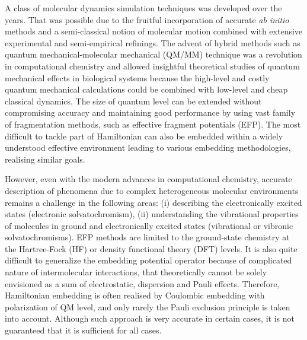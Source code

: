 \documentclass[aip,graphicx]{revtex4-1}
\begin{document}
A class of molecular dynamics simulation techniques was developed over the years. That was possible
due to the fruitful incorporation of accurate \emph{ab initio} methods and a 
semi\hyp{}classical notion of molecular motion combined with extensive experimental and semi\hyp{}empirical
refinings. The advent of hybrid methods such as quantum mechanical\hyp{}molecular mechanical (QM/MM)
technique was a revolution in computational chemistry and allowed insightful theoretical studies
of quantum mechanical effects in biological systems because the high\hyp{}level 
and costly quantum mechanical calculations
could be combined with low\hyp{}level and cheap classical dynamics. 
The size of quantum level can be extended without compromising accuracy and maintaining good performance
by using vast family of fragmentation methods, such as effective fragment potentials (EFP).
The most difficult to tackle part of Hamiltonian can also be embedded within a widely understood effective environment
leading to various embedding methodologies, realising similar goals.

However, even with the modern advances in computational chemistry, 
accurate description of phenomena due to complex heterogeneous molecular environments 
remains a challenge in the following areas: (i) describing the electronically excited states 
(electronic solvatochromism), (ii) understanding
the vibrational properties of molecules in ground and electronically excited states
(vibrational or vibronic solvatochromisms). EFP methods are limited to the ground\hyp{}state
chemistry at the Hartree\hyp{}Fock (HF) or density functional theory (DFT) levels.
It is also quite difficult to generalize the embedding potential operator
because of complicated nature of intermolecular interactions, that theoretically
cannot be solely envisioned as a sum of electrostatic, dispersion and Pauli effects.
Therefore, Hamiltonian embedding is often realised by Coulombic embedding with polarization
of QM level, and only rarely the Pauli exclusion principle is taken into account. Although
such approach is very accurate in certain cases, it is not guaranteed that it is sufficient
for all cases.
\end{document}
